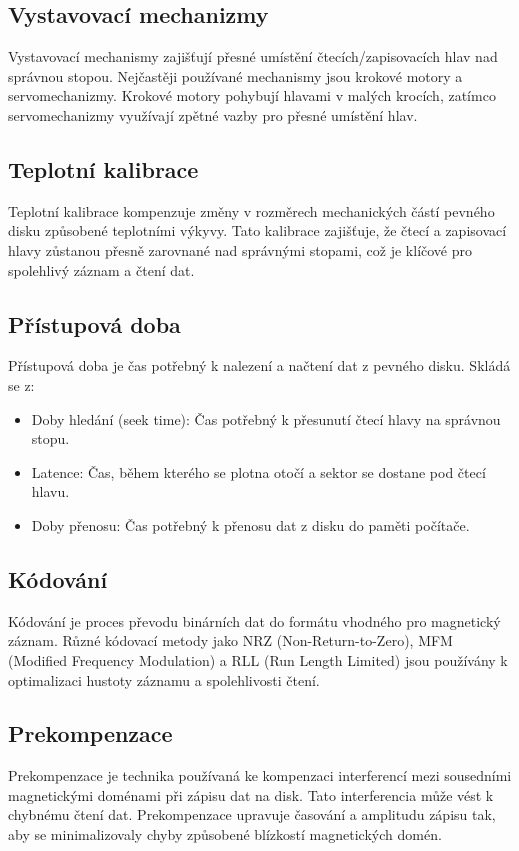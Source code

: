\subsection{Vystavovací mechanizmy}
Vystavovací mechanismy zajišťují přesné umístění čtecích/zapisovacích hlav nad správnou stopou. Nejčastěji používané mechanismy jsou krokové motory a servomechanizmy. Krokové motory pohybují hlavami v malých krocích, zatímco servomechanizmy využívají zpětné vazby pro přesné umístění hlav.

\subsection{Teplotní kalibrace}
Teplotní kalibrace kompenzuje změny v rozměrech mechanických částí pevného disku způsobené teplotními výkyvy. Tato kalibrace zajišťuje, že čtecí a zapisovací hlavy zůstanou přesně zarovnané nad správnými stopami, což je klíčové pro spolehlivý záznam a čtení dat.

\subsection{Přístupová doba}
Přístupová doba je čas potřebný k nalezení a načtení dat z pevného disku. Skládá se z:
\begin{itemize}
    \item Doby hledání (seek time): Čas potřebný k přesunutí čtecí hlavy na správnou stopu.
    \item Latence: Čas, během kterého se plotna otočí a sektor se dostane pod čtecí hlavu.
    \item Doby přenosu: Čas potřebný k přenosu dat z disku do paměti počítače.
\end{itemize}
\subsection{Kódování}
Kódování je proces převodu binárních dat do formátu vhodného pro magnetický záznam. Různé kódovací metody jako NRZ (Non-Return-to-Zero), MFM (Modified Frequency Modulation) a RLL (Run Length Limited) jsou používány k optimalizaci hustoty záznamu a spolehlivosti čtení.

\subsection{Prekompenzace}
Prekompenzace je technika používaná ke kompenzaci interferencí mezi sousedními magnetickými doménami při zápisu dat na disk. Tato interferencia může vést k chybnému čtení dat. Prekompenzace upravuje časování a amplitudu zápisu tak, aby se minimalizovaly chyby způsobené blízkostí magnetických domén.

